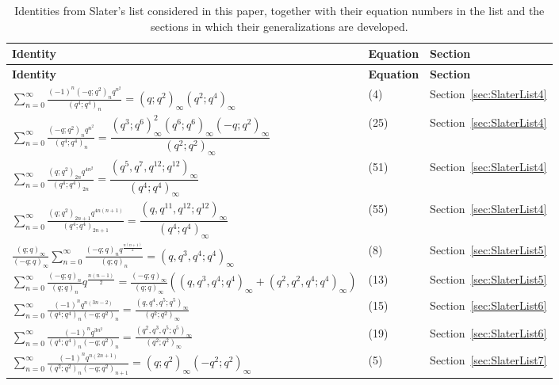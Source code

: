 \documentclass[12pt]{amsart}
\theoremstyle{definition}
\theoremstyle{remark}
\numberwithin{equation}{section}
\begin{document}
{\small\begin{longtable}{>{\raggedright\arraybackslash}p{11.5cm}
>{\centering\arraybackslash}p{1.5cm}
>{\centering\arraybackslash}p{2.5cm}}

\toprule

\textbf{Identity} & \textbf{Equation} & \textbf{Section}\\

\midrule
\endfirsthead

\toprule
\textbf{Identity} & \textbf{Equation} & \textbf{Section} \\
\midrule
\endhead
\endfoot

\bottomrule
\caption{Identities from Slater's list considered in this paper, together with their equation numbers in the list and the sections in which their generalizations are developed.}
\label{tab:slater-identities}
\endlastfoot

$\displaystyle
\sum_{n=0}^{\infty}\frac{(-1)^{n}(-q;q^2)_{n}q^{n^2}}{(q^4;q^4)_{n}}
=(q;q^2)_{\infty}(q^2;q^4)_{\infty}
$
& (4) & Section~\ref{sec:SlaterList4}\\

$\displaystyle
\sum_{n=0}^{\infty}\frac{(-q;q^2)_{n}q^{n^2}}{(q^4;q^4)_{n}}
=\dfrac{(q^3;q^6)^2_\infty(q^6;q^6)_\infty(-q;q^2)_\infty}{(q^2;q^2)_\infty}
$
& (25) & Section~\ref{sec:SlaterList4} \\

$\displaystyle
\sum_{n=0}^{\infty}\frac{(q;q^2)_{2n}q^{4n^2}}{(q^4;q^4)_{2n}}
=\dfrac{(q^5,q^7,q^{12};q^{12})_\infty}{(q^4;q^4)_\infty}
$
& (51) & Section~\ref{sec:SlaterList4} \\

$\displaystyle
\sum_{n=0}^{\infty}\frac{(q;q^2)_{2n+1}q^{4n(n+1)}}{(q^4;q^4)_{2n+1}}
=\dfrac{(q,q^{11},q^{12};q^{12})_\infty}{(q^4;q^4)_\infty}
$
& (55) & Section~\ref{sec:SlaterList4}\\

$\displaystyle
\frac{(q;q)_{\infty}}{(-q;q)_{\infty}}
\sum_{n=0}^{\infty}\frac{(-q;q)_{n}q^{\frac{n(n+1)}{2}}}{(q;q)_{n}}
=(q,q^3,q^4;q^4)_{\infty}
$
& (8) & Section~\ref{sec:SlaterList5} \\
$\displaystyle
\sum_{n=0}^{\infty}\frac{(-q;q)_{n}}{(q;q)_{n}}q^{\frac{n(n-1)}{2}}=\frac{(-q;q)_{\infty}}{(q;q)_{\infty}}\left((q,q^3,q^4;q^4)_{\infty}+(q^2,q^2,q^4;q^4)_{\infty}\right)$ & (13) & Section~\ref{sec:SlaterList5}\\

$\displaystyle
\sum_{n=0}^{\infty}\frac{(-1)^nq^{n(3n-2)}}{(q^4;q^4)_{n}(-q;q^2)_{n}}
=\frac{(q,q^4,q^5;q^5)_{\infty}}{(q^2;q^2)_{\infty}}
$
& (15) & Section~\ref{sec:SlaterList6}\\

$\displaystyle
\sum_{n=0}^{\infty}\frac{(-1)^nq^{3n^2}}{(q^4;q^4)_{n}(-q;q^2)_{n}}
=\frac{(q^2,q^3,q^5;q^5)_{\infty}}{(q^2;q^2)_{\infty}}
$
& (19) & Section~\ref{sec:SlaterList6} \\

$\displaystyle
\sum_{n=0}^{\infty}\frac{(-1)^{n}q^{n(2n+1)}}{(q^2;q^2)_{n}(-q;q^{2})_{n+1}}
=(q;q^2)_{\infty}(-q^2;q^2)_{\infty}
$
& (5) & Section~\ref{sec:SlaterList7} \\
\end{longtable}}
\end{document}
